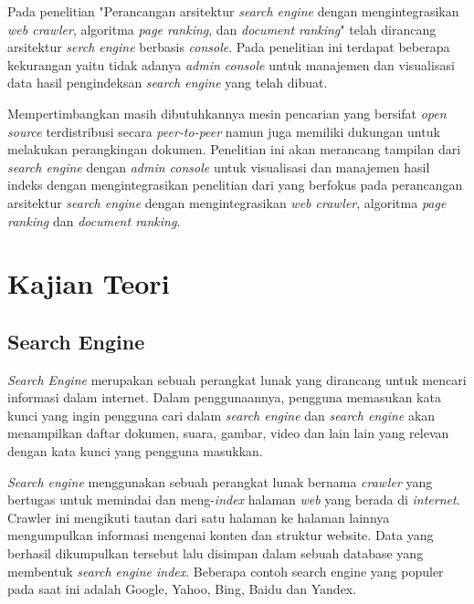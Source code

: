 \documentclass[
	a4paper, %
	10pt, %
	unnumberedsections, %
	twoside, %
]{LTJournalArticle}
\begin{document}
Pada penelitian "Perancangan arsitektur \textit{search engine} dengan mengintegrasikan \textit{web crawler}, algoritma \textit{page ranking}, dan \textit{document ranking}" \citep{lazu} telah dirancang arsitektur \textit{serch engine} berbasis \textit{console}. Pada penelitian ini terdapat beberapa kekurangan yaitu tidak adanya \textit{admin console} untuk manajemen dan visualisasi data hasil pengindeksan \textit{search engine} yang telah dibuat.

Mempertimbangkan masih dibutuhkannya mesin pencarian yang bersifat \textit{open source} terdistribusi secara \textit{peer-to-peer} namun juga memiliki dukungan untuk melakukan perangkingan dokumen. Penelitian ini akan merancang tampilan dari \textit{search engine} dengan \textit{admin console} untuk visualisasi dan manajemen hasil indeks dengan mengintegrasikan penelitian dari \cite{lazu} yang berfokus pada perancangan arsitektur \textit{search engine} dengan mengintegrasikan \textit{web crawler}, algoritma \textit{page ranking} dan \textit{document ranking}.


\section{Kajian Teori}

\subsection{Search Engine}
\textit{Search Engine} merupakan sebuah perangkat lunak yang dirancang untuk mencari informasi dalam internet. Dalam penggunaannya, pengguna memasukan kata kunci yang ingin pengguna cari dalam \textit{search engine} dan \textit{search engine} akan menampilkan daftar dokumen, suara, gambar, video dan lain lain yang relevan dengan kata kunci yang pengguna masukkan. 

\textit{Search engine} menggunakan sebuah perangkat lunak bernama \textit{crawler} yang bertugas untuk memindai dan meng-\textit{index} halaman \textit{web} yang berada di \textit{internet}. Crawler ini mengikuti tautan dari satu halaman ke halaman lainnya mengumpulkan informasi mengenai konten dan struktur website. Data yang berhasil dikumpulkan tersebut lalu disimpan dalam sebuah database yang membentuk \textit{search engine index}. Beberapa contoh search engine yang populer pada saat ini adalah Google, Yahoo, Bing, Baidu dan Yandex.
\end{document}
